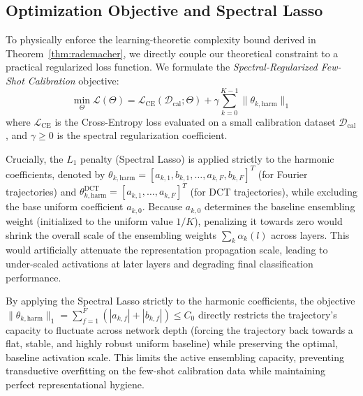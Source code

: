 \subsection{Optimization Objective and Spectral Lasso}
To physically enforce the learning-theoretic complexity bound derived in Theorem~\ref{thm:rademacher}, we directly couple our theoretical constraint to a practical regularized loss function. We formulate the \emph{Spectral-Regularized Few-Shot Calibration} objective:
\begin{equation}
    \min_{\Theta} \mathcal{L}(\Theta) = \mathcal{L}_{\text{CE}}(\mathcal{D}_{\text{cal}}; \Theta) + \gamma \sum_{k=0}^{K-1} \|\theta_{k,\text{harm}}\|_1
\end{equation}
where $\mathcal{L}_{\text{CE}}$ is the Cross-Entropy loss evaluated on a small calibration dataset $\mathcal{D}_{\text{cal}}$, and $\gamma \ge 0$ is the spectral regularization coefficient. 

Crucially, the $L_1$ penalty (Spectral Lasso) is applied strictly to the harmonic coefficients, denoted by $\theta_{k,\text{harm}} = [a_{k,1}, b_{k,1}, \dots, a_{k,F}, b_{k,F}]^T$ (for Fourier trajectories) and $\theta^{\text{DCT}}_{k,\text{harm}} = [a_{k,1}, \dots, a_{k,F}]^T$ (for DCT trajectories), while excluding the base uniform coefficient $a_{k,0}$. Because $a_{k,0}$ determines the baseline ensembling weight (initialized to the uniform value $1/K$), penalizing it towards zero would shrink the overall scale of the ensembling weights $\sum_k \alpha_k(l)$ across layers. This would artificially attenuate the representation propagation scale, leading to under-scaled activations at later layers and degrading final classification performance. 

By applying the Spectral Lasso strictly to the harmonic coefficients, the objective $\|\theta_{k,\text{harm}}\|_1 = \sum_{f=1}^F (|a_{k,f}| + |b_{k,f}|) \le C_0$ directly restricts the trajectory's capacity to fluctuate across network depth (forcing the trajectory back towards a flat, stable, and highly robust uniform baseline) while preserving the optimal, baseline activation scale. This limits the active ensembling capacity, preventing transductive overfitting on the few-shot calibration data while maintaining perfect representational hygiene.

